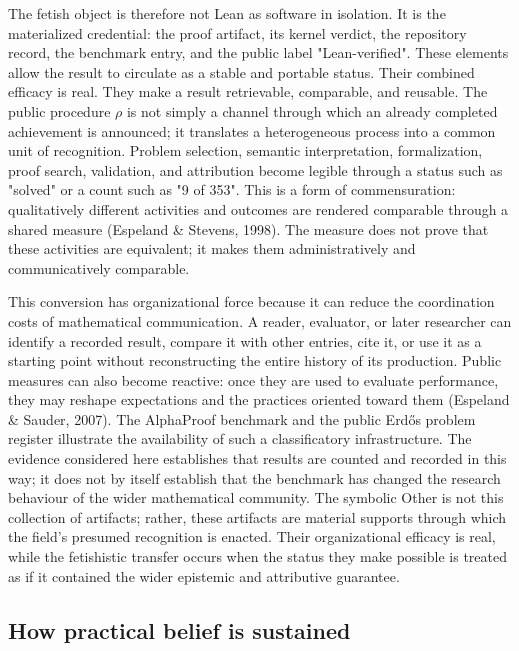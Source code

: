 \documentclass[pdflatex,sn-apa]{sn-jnl}
\begin{document}
The fetish object is therefore not Lean as software in isolation. It is the materialized credential: the proof artifact, its kernel verdict, the repository record, the benchmark entry, and the public label "Lean-verified". These elements allow the result to circulate as a stable and portable status. Their combined efficacy is real. They make a result retrievable, comparable, and reusable. The public procedure \(\rho\) is not simply a channel through which an already completed achievement is announced; it translates a heterogeneous process into a common unit of recognition. Problem selection, semantic interpretation, formalization, proof search, validation, and attribution become legible through a status such as "solved" or a count such as "9 of 353". This is a form of commensuration: qualitatively different activities and outcomes are rendered comparable through a shared measure (Espeland \& Stevens, 1998). The measure does not prove that these activities are equivalent; it makes them administratively and communicatively comparable.

This conversion has organizational force because it can reduce the coordination costs of mathematical communication. A reader, evaluator, or later researcher can identify a recorded result, compare it with other entries, cite it, or use it as a starting point without reconstructing the entire history of its production. Public measures can also become reactive: once they are used to evaluate performance, they may reshape expectations and the practices oriented toward them (Espeland \& Sauder, 2007). The AlphaProof benchmark and the public Erdős problem register illustrate the availability of such a classificatory infrastructure. The evidence considered here establishes that results are counted and recorded in this way; it does not by itself establish that the benchmark has changed the research behaviour of the wider mathematical community. The symbolic Other is not this collection of artifacts; rather, these artifacts are material supports through which the field's presumed recognition is enacted. Their organizational efficacy is real, while the fetishistic transfer occurs when the status they make possible is treated as if it contained the wider epistemic and attributive guarantee.

\subsection{How practical belief is sustained}
\end{document}
